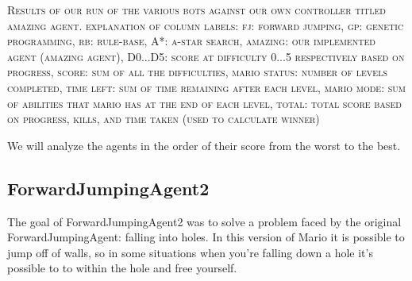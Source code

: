 \documentclass[12pt]{article}
\begin{document}
\begin{center}
\begin{table}[h]
\caption*{\footnotesize Controller Scores}
\end{table}
\vspace{-3ex}
\textsc{\scriptsize Results of our run of the various bots against our own controller titled amazing agent. explanation of column labels: fj: forward jumping, gp: genetic programming, rb: rule-base, A*: a-star search, amazing: our implemented agent (amazing agent), D0...D5: score at difficulty 0...5 respectively based on progress, score: sum of all the difficulties, mario status: number of levels completed, time left: sum of time remaining after each level, mario mode: sum of abilities that mario has at the end of each level, total: total score based on progress, kills, and time taken (used to calculate winner)}
\end{center}

\begin{multicols*}{2}
We will analyze the agents in the order of their score from the worst to the best.
\subsection*{ForwardJumpingAgent2}
The goal of ForwardJumpingAgent2 was to solve a problem faced by the original 
ForwardJumpingAgent: falling into holes.  In this version of Mario it is possible to jump off of walls, 
so in some situations when you're falling down a hole it's possible to to within the hole and free 
yourself.
\end{multicols*}
\end{document}
